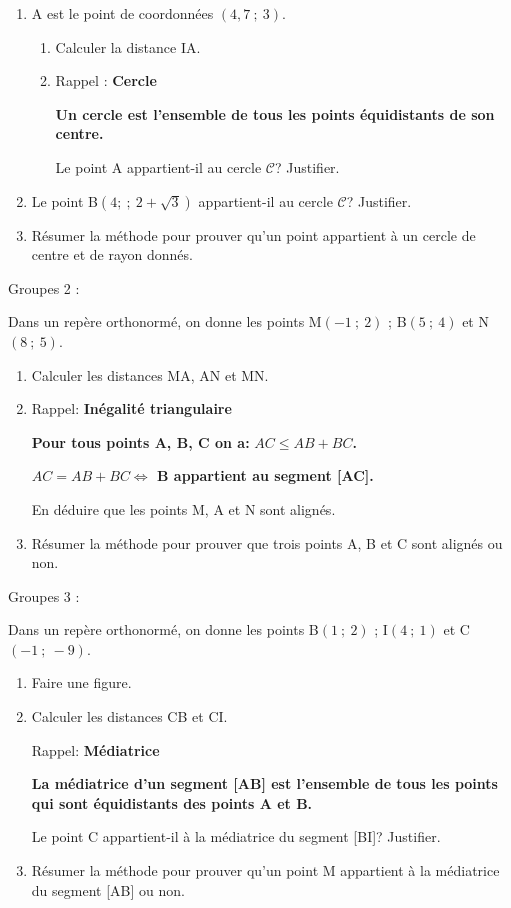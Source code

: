 \begin{enumerate}
\item A est le point de coordonnées $(4,7~;~3)$. 
\begin{enumerate}[label=\alph*)]
\item Calculer la distance IA.
\item Rappel : \textbf{Cercle}

\textbf{Un cercle est l'ensemble de tous les points équidistants de son centre.}

Le point A appartient-il au cercle $\mathcal{C}$? Justifier.
\end{enumerate}
\item Le point B$(4;~;~2+\sqrt{3})$ appartient-il au cercle $\mathcal{C}$? Justifier.
\item Résumer la méthode pour prouver qu'un point appartient à  un cercle de centre et de rayon donnés.
\end{enumerate}

Groupes 2 :

Dans un repère orthonormé, on donne les points M$(-1~;~2)$ ; B$(5~;~4)$ et N$(8~;~5)$.

\begin{enumerate}
\item Calculer les distances MA, AN et MN.
\item Rappel: \textbf{Inégalité triangulaire}

\textbf{Pour tous points A, B, C on a:} \textbf{ $AC \leqslant AB+BC$.}

\textbf{$AC = AB+BC \iff$ B appartient au segment [AC].}
 
En déduire que les points M, A et N sont alignés.
\item Résumer la méthode pour prouver que trois points A, B et C sont alignés ou non.
\end{enumerate}

Groupes 3 :

Dans un repère orthonormé, on donne les points B$(1~;~2)$ ; I$(4~;~1)$ et C$(-1~;~-9)$.

\begin{enumerate}
\item Faire une figure.
\item Calculer les distances CB et CI.

Rappel: \textbf{Médiatrice}

\textbf{La médiatrice d'un segment [AB] est l'ensemble de tous les points qui sont équidistants des points A et B.}
 
Le point C appartient-il à la médiatrice du segment [BI]? Justifier.
\item Résumer la méthode pour prouver qu'un point M appartient à la médiatrice du segment [AB] ou non.
\end{enumerate}

